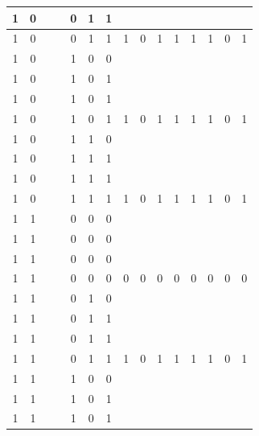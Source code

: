 \begin{table}[!tb]
\begin{tabular}{|c|c|c|c|c|c|c|c|c|c|c|c|c|c|c|}
        \rowcolor{yellow!40} 1 & 0 &  &  & 0 & 1 & 1 &  &  &  &  &  &  &  &  \\ \hline
        \rowcolor{yellow!40} 1 & 0 &  &  & 0 & 1 & 1 & 1 & 0 & 1 & 1 & 1 & 1 & 0 & 1 \\ \hline
        \rowcolor{gray!40} 1 & 0 &  &  & 1 & 0 & 0 &  &  &  &  &  &  &  &  \\ \hline
        \rowcolor{gray!40} 1 & 0 &  &  & 1 & 0 & 1 &  &  &  &  &  &  &  &  \\ \hline
        \rowcolor{gray!40} 1 & 0 &  &  & 1 & 0 & 1 &  &  &  &  &  &  &  &  \\ \hline
        \rowcolor{gray!40} 1 & 0 &  &  & 1 & 0 & 1 & 1 & 0 & 1 & 1 & 1 & 1 & 0 & 1 \\ \hline
        \rowcolor{blue!40} 1 & 0 &  &  & 1 & 1 & 0 &  &  &  &  &  &  &  &  \\ \hline
        \rowcolor{blue!40} 1 & 0 &  &  & 1 & 1 & 1 &  &  &  &  &  &  &  &  \\ \hline
        \rowcolor{blue!40} 1 & 0 &  &  & 1 & 1 & 1 &  &  &  &  &  &  &  &  \\ \hline
        \rowcolor{blue!40} 1 & 0 &  &  & 1 & 1 & 1 & 1 & 0 & 1 & 1 & 1 & 1 & 0 & 1 \\ \hline
        \rowcolor{red!40} 1 & 1 &  &  & 0 & 0 & 0 &  &  &  &  &  &  &  &  \\ \hline
        \rowcolor{red!40} 1 & 1 &  &  & 0 & 0 & 0 &  &  &  &  &  &  &  &  \\ \hline
        \rowcolor{red!40} 1 & 1 &  &  & 0 & 0 & 0 &  &  &  &  &  &  &  &  \\ \hline
        \rowcolor{red!40} 1 & 1 &  &  & 0 & 0 & 0 & 0 & 0 & 0 & 0 & 0 & 0 & 0 & 0 \\ \hline
        \rowcolor{green!40} 1 & 1 &  &  & 0 & 1 & 0 &  &  &  &  &  &  &  &  \\ \hline
        \rowcolor{green!40} 1 & 1 &  &  & 0 & 1 & 1 &  &  &  &  &  &  &  &  \\ \hline
        \rowcolor{green!40} 1 & 1 &  &  & 0 & 1 & 1 &  &  &  &  &  &  &  &  \\ \hline
        \rowcolor{green!40} 1 & 1 &  &  & 0 & 1 & 1 & 1 & 0 & 1 & 1 & 1 & 1 & 0 & 1 \\ \hline
        \rowcolor{yellow!40} 1 & 1 &  &  & 1 & 0 & 0 &  &  &  &  &  &  &  &  \\ \hline
        \rowcolor{yellow!40} 1 & 1 &  &  & 1 & 0 & 1 &  &  &  &  &  &  &  &  \\ \hline
        \rowcolor{yellow!40} 1 & 1 &  &  & 1 & 0 & 1 &  &  &  &  &  &  &  &  \\ \hline

\end{tabular}
\end{table}
